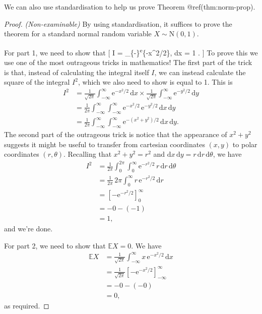 \documentclass[
  letterpaper,
]{report}
\theoremstyle{definition}
\theoremstyle{definition}
\theoremstyle{remark}
\begin{document}
We can also use standardisation to help us prove Theorem
@ref(thm:norm-prop).

\begin{proof}

\emph{(Non-examinable)} By using standardisation, it suffices to prove
the theorem for a standard normal random variable
\(X \sim \mathrm{N}(0,1)\).

For part 1, we need to show that {[} I = 
\int\_\{-\infty\}\textsuperscript{\infty \mathrm e}\{-x\^{}2/2\},
\mathrm dx = 1 . {]} To prove this we use one of the most outrageous
tricks in mathematics! The first part of the trick is that, instead of
calculating the integral itself \(I\), we can instead calculate the
square of the integral \(I^2\), which we also need to show is equal to
1. This is \begin{align*}
  I^2 &= \frac{1}{\sqrt{2\pi}} \int_{-\infty}^\infty \mathrm e^{-x^2/2}\, \mathrm dx \times \frac{1}{\sqrt{2\pi}} \int_{-\infty}^\infty \mathrm e^{-y^2/2}\, \mathrm dy\\
    &= \frac{1}{2\pi} \int_{-\infty}^\infty \int_{-\infty}^\infty  \mathrm e^{-x^2/2}\,\mathrm e^{-y^2/2} \, \mathrm dx\, \mathrm dy \\
    &= \frac{1}{2\pi} \int_{-\infty}^\infty \int_{-\infty}^\infty  \mathrm e^{-(x^2+y^2)/2}\,\mathrm dx\, \mathrm dy .
\end{align*} The second part of the outrageous trick is notice that the
appearance of \(x^2 + y^2\) suggests it might be useful to transfer from
cartesian coordinates \((x,y)\) to polar coordinates \((r, \theta)\).
Recalling that \(x^2 + y^2 = r^2\) and
\(\mathrm dx\, \mathrm dy = r\, \mathrm dr \,\mathrm d\theta\), we have
\begin{align*}
  I^2 &= \frac{1}{2\pi} \int_{0}^{2\pi} \int_{0}^\infty  \mathrm e^{-r^2/2}\,r\,\mathrm dr\, \mathrm d\theta \\
    &= \frac{1}{2\pi} \, 2\pi\int_{0}^\infty  r\, \mathrm e^{-r^2/2}\,\mathrm dr \\
    &= \left[ -\mathrm e^{-r^2/2} \right]_0^\infty \\
    &= - 0 -(-1) \\
    &= 1 ,
\end{align*} and we're done.

For part 2, we need to show that \(\mathbb EX = 0\). We have
\begin{align*}
\mathbb EX &= \frac{1}{\sqrt{2\pi}} \int_{-\infty}^{\infty} x\,  \mathrm e^{-x^2/2}\, \mathrm dx \\
  &= \frac{1}{\sqrt{2\pi}} \left[-\mathrm e^{-x^2/2}\right]_{-\infty}^\infty \\
  &= -0 - (-0) \\
  &= 0 ,
\end{align*} as required.


\end{proof}
\end{document}
